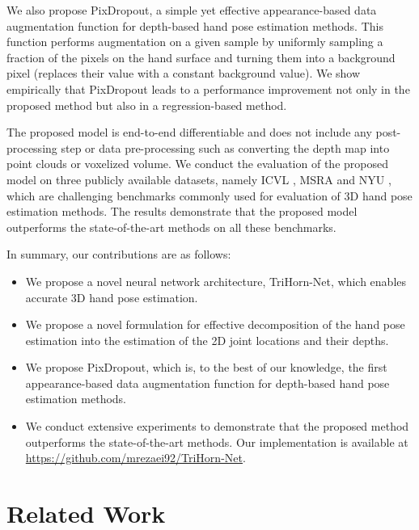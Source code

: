 \documentclass{article}
\begin{document}
\par
We also propose PixDropout, a simple yet effective appearance-based data augmentation function for depth-based hand pose estimation methods. This function performs augmentation on a given sample by uniformly sampling a fraction of the pixels on the hand surface and turning them into a background pixel (replaces their value with a constant background value). We show empirically that PixDropout leads to a performance improvement not only in the proposed method but also in a regression-based method.  
\par

The proposed model is end-to-end differentiable and does not include any post-processing step or data pre-processing such as converting the depth map into point clouds \cite{chen2019so,ge2018hand,cheng2021handfoldingnet} or voxelized volume\cite{moon2018v2v}.
We conduct the evaluation of the proposed model on three publicly available datasets, namely ICVL \cite{tang2014latent}, MSRA \cite{sun2015cascaded} and NYU \cite{tompson2014real}, which are challenging benchmarks commonly used for evaluation of 3D hand pose estimation methods. The results demonstrate that the proposed model outperforms the state-of-the-art methods on all these benchmarks.


In summary, our contributions are as follows:
\begin{itemize}
  \item We propose a novel neural network architecture, TriHorn-Net, which enables accurate 3D hand pose estimation.
  \item We propose a novel formulation for effective decomposition of the hand pose estimation into the estimation of the 2D joint locations and their depths. 
  \item We propose PixDropout, which is, to the best of our knowledge, the first appearance-based data augmentation function for depth-based hand pose estimation methods.
  \item We conduct extensive experiments to demonstrate that the proposed method outperforms the state-of-the-art methods. Our implementation is available at \url{https://github.com/mrezaei92/TriHorn-Net}.
\end{itemize}

\section{Related Work}
\end{document}
